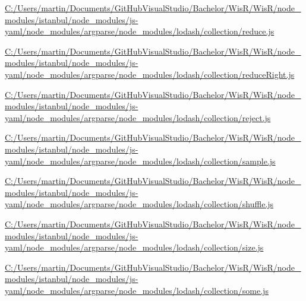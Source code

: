 \begin{DoxyCompactItemize}
\item 
\hyperlink{_c_1_2_users_2martin_2_documents_2_git_hub_visual_studio_2_bachelor_2_wis_r_2_wis_r_2node_moduleeb072a054beac4b00aefef72228fc53c}{C\+:/\+Users/martin/\+Documents/\+Git\+Hub\+Visual\+Studio/\+Bachelor/\+Wis\+R/\+Wis\+R/node\+\_\+modules/istanbul/node\+\_\+modules/js-\/yaml/node\+\_\+modules/argparse/node\+\_\+modules/lodash/collection/reduce.\+js}
\item 
\hyperlink{_c_1_2_users_2martin_2_documents_2_git_hub_visual_studio_2_bachelor_2_wis_r_2_wis_r_2node_module671f51f951fa4dfb41949ac0f2c99054}{C\+:/\+Users/martin/\+Documents/\+Git\+Hub\+Visual\+Studio/\+Bachelor/\+Wis\+R/\+Wis\+R/node\+\_\+modules/istanbul/node\+\_\+modules/js-\/yaml/node\+\_\+modules/argparse/node\+\_\+modules/lodash/collection/reduce\+Right.\+js}
\item 
\hyperlink{_c_1_2_users_2martin_2_documents_2_git_hub_visual_studio_2_bachelor_2_wis_r_2_wis_r_2node_module44c42a36dd3854cd8504d6c819b57b4b}{C\+:/\+Users/martin/\+Documents/\+Git\+Hub\+Visual\+Studio/\+Bachelor/\+Wis\+R/\+Wis\+R/node\+\_\+modules/istanbul/node\+\_\+modules/js-\/yaml/node\+\_\+modules/argparse/node\+\_\+modules/lodash/collection/reject.\+js}
\item 
\hyperlink{_c_1_2_users_2martin_2_documents_2_git_hub_visual_studio_2_bachelor_2_wis_r_2_wis_r_2node_module011729be51caac2cb4bcd9dae4b7475c}{C\+:/\+Users/martin/\+Documents/\+Git\+Hub\+Visual\+Studio/\+Bachelor/\+Wis\+R/\+Wis\+R/node\+\_\+modules/istanbul/node\+\_\+modules/js-\/yaml/node\+\_\+modules/argparse/node\+\_\+modules/lodash/collection/sample.\+js}
\item 
\hyperlink{_c_1_2_users_2martin_2_documents_2_git_hub_visual_studio_2_bachelor_2_wis_r_2_wis_r_2node_module4fa44d4fc98206bd4a9b7861bf9716d5}{C\+:/\+Users/martin/\+Documents/\+Git\+Hub\+Visual\+Studio/\+Bachelor/\+Wis\+R/\+Wis\+R/node\+\_\+modules/istanbul/node\+\_\+modules/js-\/yaml/node\+\_\+modules/argparse/node\+\_\+modules/lodash/collection/shuffle.\+js}
\item 
\hyperlink{_c_1_2_users_2martin_2_documents_2_git_hub_visual_studio_2_bachelor_2_wis_r_2_wis_r_2node_module822b491b7fc78c7a5ad6e294db8bef44}{C\+:/\+Users/martin/\+Documents/\+Git\+Hub\+Visual\+Studio/\+Bachelor/\+Wis\+R/\+Wis\+R/node\+\_\+modules/istanbul/node\+\_\+modules/js-\/yaml/node\+\_\+modules/argparse/node\+\_\+modules/lodash/collection/size.\+js}
\item 
\hyperlink{_c_1_2_users_2martin_2_documents_2_git_hub_visual_studio_2_bachelor_2_wis_r_2_wis_r_2node_module8e6549b27534111e78e3ebc6625f2b77}{C\+:/\+Users/martin/\+Documents/\+Git\+Hub\+Visual\+Studio/\+Bachelor/\+Wis\+R/\+Wis\+R/node\+\_\+modules/istanbul/node\+\_\+modules/js-\/yaml/node\+\_\+modules/argparse/node\+\_\+modules/lodash/collection/some.\+js}

\end{DoxyCompactItemize}
